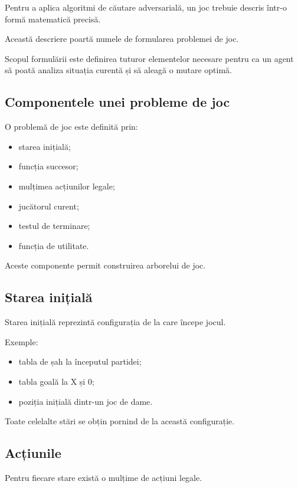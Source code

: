 \documentclass[12pt,a4paper]{article}
\begin{document}
Pentru a aplica algoritmi de căutare adversarială, un joc trebuie descris într-o formă matematică precisă.

Această descriere poartă numele de formularea problemei de joc.

Scopul formulării este definirea tuturor elementelor necesare pentru ca un agent să poată analiza situația curentă și să aleagă o mutare optimă.

\subsection{Componentele unei probleme de joc}

O problemă de joc este definită prin:

\begin{itemize}
\item starea inițială;
\item funcția succesor;
\item mulțimea acțiunilor legale;
\item jucătorul curent;
\item testul de terminare;
\item funcția de utilitate.
\end{itemize}

Aceste componente permit construirea arborelui de joc.

\subsection{Starea inițială}

Starea inițială reprezintă configurația de la care începe jocul.

Exemple:

\begin{itemize}
\item tabla de șah la începutul partidei;
\item tabla goală la X și 0;
\item poziția inițială dintr-un joc de dame.
\end{itemize}

Toate celelalte stări se obțin pornind de la această configurație.

\subsection{Acțiunile}

Pentru fiecare stare există o mulțime de acțiuni legale.
\end{document}
